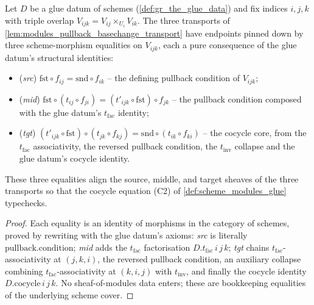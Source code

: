 \begin{lemma}
  \label{lem:gr_glueData_bridges}
  Let \(D\) be a glue datum of schemes (\cref{def:gr_the_glue_data}) and fix
  indices \(i,j,k\) with triple overlap \(V_{ijk} = V_{ij} \times_{U_i} V_{ik}\).
  The three transports of \cref{lem:modules_pullback_basechange_transport} have
  endpoints pinned down by three scheme-morphism equalities on \(V_{ijk}\), each a
  pure consequence of the glue datum's structural identities:
  \begin{itemize}
    \item (\emph{src}) \(\mathrm{fst} \circ f_{ij} = \mathrm{snd} \circ f_{ik}\)
      -- the defining pullback condition of \(V_{ijk}\);
    \item (\emph{mid}) \(\mathrm{fst} \circ (t_{ij} \circ f_{ji})
      = (t'_{ijk} \circ \mathrm{fst}) \circ f_{jk}\) -- the pullback condition
      composed with the glue datum's \(t_{\mathrm{fac}}\) identity;
    \item (\emph{tgt}) \((t'_{ijk} \circ \mathrm{fst}) \circ (t_{jk} \circ f_{kj})
      = \mathrm{snd} \circ (t_{ik} \circ f_{ki})\) -- the cocycle core, from the
      \(t_{\mathrm{fac}}\) associativity, the reversed pullback condition, the
      \(t_{\mathrm{inv}}\) collapse and the glue datum's cocycle identity.
  \end{itemize}
  These three equalities align the source, middle, and target sheaves of the three
  transports so that the cocycle equation (C2) of \cref{def:scheme_modules_glue}
  typechecks.
\end{lemma}
\begin{proof}  
  Each equality is an identity of morphisms in the category of schemes, proved by
  rewriting with the glue datum's axioms: \emph{src} is literally
  \(\mathrm{pullback.condition}\); \emph{mid} adds the \(t_{\mathrm{fac}}\)
  factorisation \(D.t_{\mathrm{fac}}\,i\,j\,k\); \emph{tgt} chains
  \(t_{\mathrm{fac}}\)-associativity at \((j,k,i)\), the reversed pullback
  condition, an auxiliary collapse combining \(t_{\mathrm{fac}}\)-associativity at
  \((k,i,j)\) with \(t_{\mathrm{inv}}\), and finally the cocycle identity
  \(D.\mathrm{cocycle}\,i\,j\,k\). No sheaf-of-modules data enters; these are
  bookkeeping equalities of the underlying scheme cover.
\end{proof}

